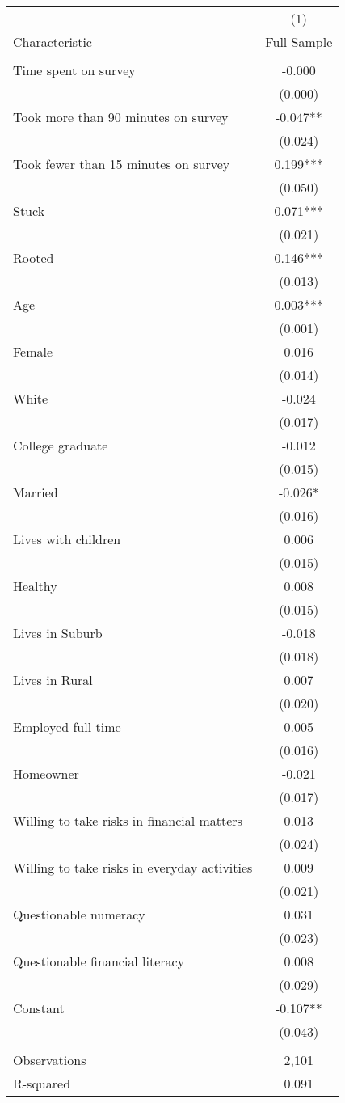 \begin{tabular}{lc} \hline
 & (1) \\
Characteristic & Full Sample \\ \hline
 &  \\
Time spent on survey & -0.000 \\
 & (0.000) \\
Took more than 90 minutes on survey & -0.047** \\
 & (0.024) \\
Took fewer than 15 minutes on survey & 0.199*** \\
 & (0.050) \\
Stuck & 0.071*** \\
 & (0.021) \\
Rooted & 0.146*** \\
 & (0.013) \\
Age & 0.003*** \\
 & (0.001) \\
Female & 0.016 \\
 & (0.014) \\
White & -0.024 \\
 & (0.017) \\
College graduate & -0.012 \\
 & (0.015) \\
Married & -0.026* \\
 & (0.016) \\
Lives with children & 0.006 \\
 & (0.015) \\
Healthy & 0.008 \\
 & (0.015) \\
Lives in Suburb & -0.018 \\
 & (0.018) \\
Lives in Rural & 0.007 \\
 & (0.020) \\
Employed full-time & 0.005 \\
 & (0.016) \\
Homeowner & -0.021 \\
 & (0.017) \\
Willing to take risks in financial matters & 0.013 \\
 & (0.024) \\
Willing to take risks in everyday activities & 0.009 \\
 & (0.021) \\
Questionable numeracy & 0.031 \\
 & (0.023) \\
Questionable financial literacy & 0.008 \\
 & (0.029) \\
Constant & -0.107** \\
 & (0.043) \\
 &  \\
Observations & 2,101 \\
 R-squared & 0.091 \\ \hline
\end{tabular}
